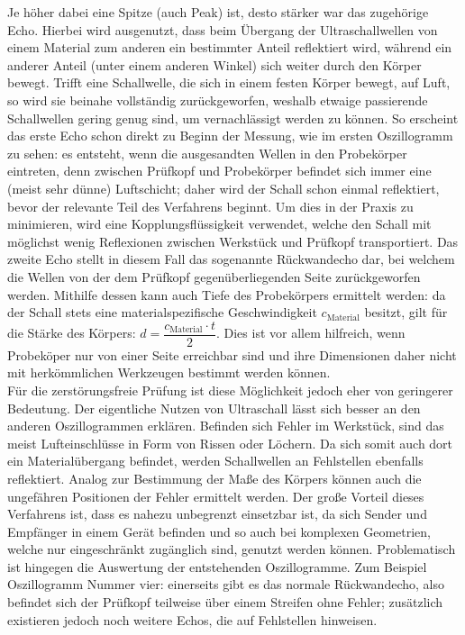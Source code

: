 \documentclass[reducespace,stylepage,semiarbeit]{spezidoc}
\begin{document}
Je höher dabei eine Spitze (auch Peak) ist, desto stärker war das zugehörige Echo. 
Hierbei wird ausgenutzt, dass beim Übergang der Ultraschallwellen von einem Material zum anderen ein bestimmter Anteil reflektiert wird, während ein anderer Anteil (unter einem anderen Winkel) sich weiter durch den Körper bewegt. 
Trifft eine Schallwelle, die sich in einem festen Körper bewegt, auf Luft, so wird sie beinahe vollständig zurückgeworfen, weshalb etwaige passierende Schallwellen gering genug sind, um vernachlässigt werden zu können. 
So erscheint das erste Echo schon direkt zu Beginn der Messung, wie im ersten Oszillogramm zu sehen: es entsteht, wenn die ausgesandten Wellen in den Probekörper eintreten, denn zwischen Prüfkopf und Probekörper befindet sich immer eine (meist sehr dünne) Luftschicht; daher wird der Schall schon einmal reflektiert, bevor der relevante Teil des Verfahrens beginnt. 
Um dies in der Praxis zu minimieren, wird eine Kopplungsflüssigkeit verwendet, welche den Schall mit möglichst wenig Reflexionen zwischen Werkstück und Prüfkopf transportiert. 
Das zweite Echo stellt in diesem Fall das sogenannte Rückwandecho dar, bei welchem die Wellen von der dem Prüfkopf gegenüberliegenden Seite zurückgeworfen werden. 
Mithilfe dessen kann auch Tiefe des Probekörpers ermittelt werden: da der Schall stets eine materialspezifische Geschwindigkeit $c_\mathrm{Material}$  \cite{schallgeschwindigkeiten}  %
besitzt, gilt für die Stärke des Körpers: $d = \dfrac{c_{\mathrm{Material}} \cdot t}{2}$. 
Dies ist vor allem hilfreich, wenn Probeköper nur von einer Seite erreichbar sind und ihre Dimensionen daher nicht mit herkömmlichen Werkzeugen bestimmt werden können.\\
Für die zerstörungsfreie Prüfung ist diese Möglichkeit jedoch eher von geringerer Bedeutung. 
Der eigentliche Nutzen von Ultraschall lässt sich besser an den anderen Oszillogrammen erklären. 
Befinden sich Fehler im Werkstück, sind das meist Lufteinschlüsse in Form von Rissen oder Löchern. 
Da sich somit auch dort ein Materialübergang befindet, werden Schallwellen an Fehlstellen ebenfalls reflektiert. 
Analog zur Bestimmung der Maße des Körpers können auch die ungefähren Positionen der Fehler ermittelt werden. 
Der große Vorteil dieses Verfahrens ist, dass es nahezu unbegrenzt einsetzbar ist, da sich Sender und Empfänger in einem Gerät befinden und so auch bei komplexen Geometrien, welche nur eingeschränkt zugänglich sind, genutzt werden können. 
Problematisch ist hingegen die Auswertung der entstehenden Oszillogramme. 
Zum Beispiel Oszillogramm Nummer vier: einerseits gibt es das normale Rückwandecho, also befindet sich der Prüfkopf teilweise über einem Streifen ohne Fehler; zusätzlich existieren jedoch noch weitere Echos, die auf Fehlstellen hinweisen. 
\end{document}
